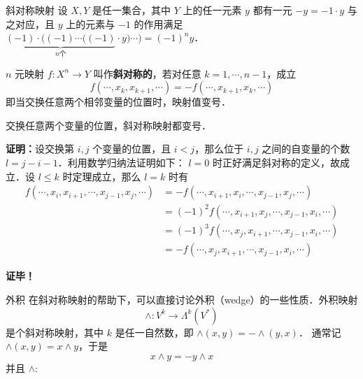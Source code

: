 

\begin{definition}{斜对称映射}
设 $X,Y$ 是任一集合，其中 $Y$ 上的任一元素 $y$ 都有一元 $-y=-1\cdot y$ 与之对应，且 $y$ 上的元素与 $-1$ 的作用满足 $\underbrace{(-1)\cdot((-1)\cdots((-1)}_{n\text{个}}\cdot y)\cdots)=(-1)^n y$．

 $n$ 元映射 $f:X^n\rightarrow Y$ 叫作\textbf{斜对称的}，若对任意 $k=1,\cdots,n-1$，成立
\begin{equation}
f(\cdots,x_k,x_{k+1},\cdots)=-f(\cdots,x_{k+1},x_k,\cdots)
\end{equation}
即当交换任意两个相邻变量的位置时，映射值变号．
\end{definition}
\begin{theorem}{}
交换任意两个变量的位置，斜对称映射都变号．
\end{theorem}
\textbf{证明：}设交换第 $i,j$ 个变量的位置，且 $i<j$，那么位于 $i,j$ 之间的自变量的个数 $l=j-i-1$．利用数学归纳法证明如下： $l=0$ 时正好满足斜对称的定义，故成立．设 $l\leq k$ 时定理成立，那么 $l=k$ 时有
\begin{equation}
\begin{aligned}
f(\cdots,x_i,x_{i+1},\cdots,x_{j-1},x_j,\cdots)&=-f(\cdots,x_{i+1},x_{i},\cdots,x_{j-1},x_j,\cdots)\\
&=(-1)^2 f(\cdots,x_{i+1},x_{j},\cdots,x_{j-1},x_i,\cdots)\\
&=(-1)^3 f(\cdots,x_{j},x_{i+1},\cdots,x_{j-1},x_i,\cdots)\\
&=-f(\cdots,x_{j},x_{i+1},\cdots,x_{j-1},x_i,\cdots)
\end{aligned}
\end{equation}
  
\textbf{证毕！}
\begin{example}{外积}
在斜对称映射的帮助下，可以直接讨论外积（wedge）的一些性质．外积映射
\begin{equation}
\wedge:V^k\rightarrow \Lambda^k(V^*)
\end{equation}
是个斜对称映射，其中 $k$ 是任一自然数，即 $\wedge(x,y)=-\wedge(y,x)$． 通常记 $\wedge(x,y)=x\wedge y$，于是
\begin{equation}
x\wedge y=-y\wedge x
\end{equation}
并且 $\wedge:$
\end{example}